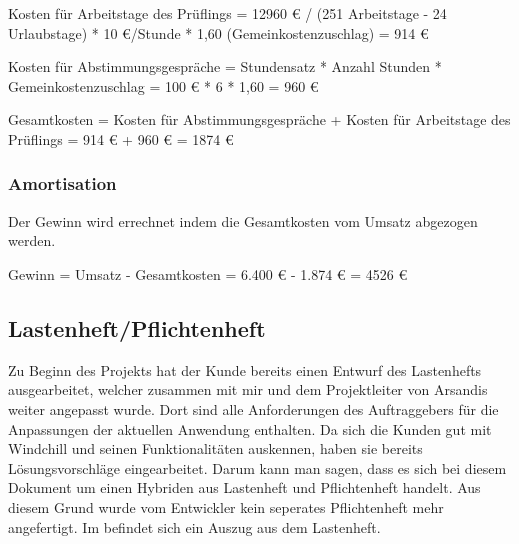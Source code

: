 Kosten für Arbeitstage des Prüflings = 12960 € / (251 Arbeitstage - 24 Urlaubstage) * 10 €/Stunde * 1,60 (Gemeinkostenzuschlag) = 914 €

Kosten für Abstimmungsgespräche = Stundensatz * Anzahl Stunden * Gemeinkostenzuschlag = 100 € * 6 * 1,60 = 960 €

Gesamtkosten = Kosten für Abstimmungsgespräche + Kosten für Arbeitstage des Prüflings = 914 € + 960 € = 1874 €

\subsubsection{Amortisation}
Der Gewinn wird errechnet indem die Gesamtkosten vom Umsatz abgezogen werden.

Gewinn = Umsatz - Gesamtkosten = 6.400 € - 1.874 € = 4526 €

\subsection{Lastenheft/Pflichtenheft}
\label{sec:Lastenheft}
Zu Beginn des Projekts hat der Kunde bereits einen Entwurf des Lastenhefts ausgearbeitet, welcher zusammen mit mir und dem Projektleiter von Arsandis weiter angepasst wurde.
Dort sind alle Anforderungen des Auftraggebers für die Anpassungen der aktuellen Anwendung enthalten.
Da sich die Kunden gut mit Windchill und seinen Funktionalitäten auskennen, haben sie bereits Lösungsvorschläge eingearbeitet.
Darum kann man sagen, dass es sich bei diesem Dokument um einen Hybriden aus Lastenheft und Pflichtenheft handelt.
Aus diesem Grund wurde vom Entwickler kein seperates Pflichtenheft mehr angefertigt.
Im  befindet sich ein Auszug aus dem Lastenheft.
